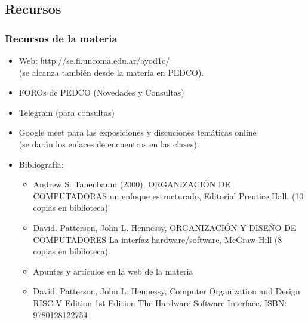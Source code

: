 \documentclass[aspectratio=169,compress]{beamer}
\begin{document}


\subsection{Recursos}

\begin{frame}[fragile]
  \frametitle{Recursos de la materia}

\begin{small}
\begin{itemize}

\item Web: \footnotesize{\texttt http://se.fi.uncoma.edu.ar/ayod1c/}\\
(se alcanza también desde la materia en PEDCO).

\item FOROs de PEDCO (Novedades y Consultas)
\item Telegram (para consultas)
\item Google meet para las exposiciones y discuciones temáticas online\\ (se darán los enlaces de encuentros en las clases).
\item Bibliografía:

\begin{itemize}

\item Andrew S. Tanenbaum (2000), ORGANIZACIÓN DE COMPUTADORAS un enfoque estructurado, Editorial Prentice Hall. (10 copias en biblioteca)
\item David. Patterson, John L. Hennessy, ORGANIZACIÓN Y DISEÑO DE COMPUTADORES La interfaz hardware/software, McGraw-Hill (8 copias en biblioteca).
\item Apuntes y artículos en la web de la materia
\item David. Patterson, John L. Hennessy, Computer Organization and Design RISC-V Edition 1st Edition The Hardware Software Interface. ISBN: 9780128122754

\end{itemize}

\end{itemize}
\end{small}

\end{frame}
\end{document}
